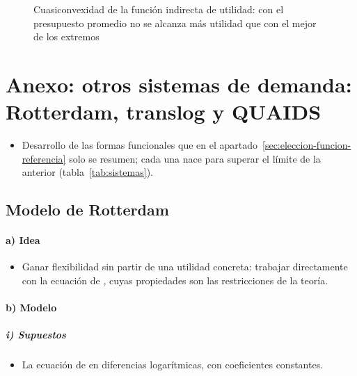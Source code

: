 \documentclass[11pt]{article}
\begin{document}
\begin{figure}[H]
\centering
\caption{Cuasiconvexidad de la función indirecta de utilidad: con el presupuesto promedio no se alcanza más utilidad que con el mejor de los extremos}\label{fig:cuasiconvexidad-fiu}
\end{figure}

\section{Anexo: otros sistemas de demanda:\cortetitulo{} Rotterdam, translog y QUAIDS}\label{anexo:sistemas}

\begin{itemize}
\item Desarrollo de las formas funcionales que en el apartado~\ref{sec:eleccion-funcion-referencia} solo se resumen; cada una nace para superar el límite de la anterior (tabla~\ref{tab:sistemas}).
\end{itemize}

\subsection{Modelo de Rotterdam}\label{anexo:rotterdam}

\paragraph{a) Idea}

\begin{itemize}
\item Ganar flexibilidad sin partir de una utilidad concreta: trabajar directamente con la ecuación de , cuyas propiedades son las restricciones de la teoría\nocite{Barten1964Consumer,Theil1965Information}.
\end{itemize}

\paragraph{b) Modelo}

\subparagraph{i) Supuestos}

\begin{itemize}
\item La ecuación de  en diferencias logarítmicas, con coeficientes constantes.
\end{itemize}
\end{document}
